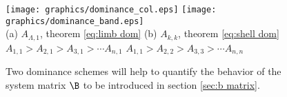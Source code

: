 \begin{figure}[htbp] %
   \centering
   \texttt{[image: graphics/dominance\_col.eps]} \qquad
   \texttt{[image: graphics/dominance\_band.eps]} \\
   (a) $A_{\Lambda,1}$,  theorem \eqref{eq:limb dom}  \qquad  \qquad  \qquad
   (b) $A_{k,k}$,  theorem \eqref{eq:shell dom} \\
   $A_{1,1} > A_{2,1} > A_{3,1} > \cdots A_{n,1}$ \qquad
   $A_{1,1} > A_{2,2} > A_{3,3} > \cdots A_{n,n}$
   \caption{Two dominance schemes will help to quantify the behavior of the system matrix $\B$ to be introduced in section \eqref{sec:b matrix}.}
   \label{fig:hierarchies}
\end{figure}

\endinput
